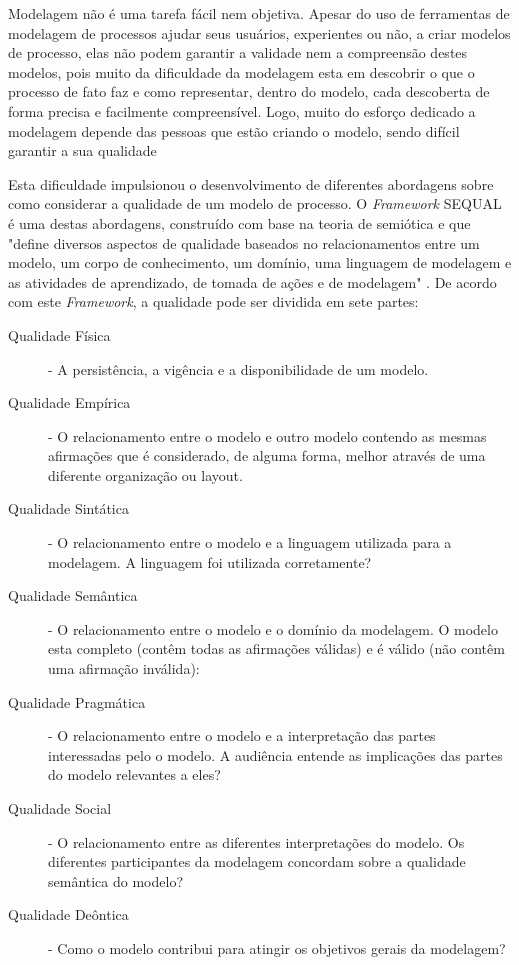 \documentclass[12pt]{article}
\begin{document}
Modelagem não é uma tarefa fácil nem objetiva. Apesar do uso de ferramentas de modelagem de processos ajudar seus usuários, experientes ou não, a criar modelos de processo, elas não podem garantir a validade nem a compreensão destes modelos, pois muito da dificuldade da modelagem esta em descobrir o que o processo de fato faz e como representar, dentro do modelo, cada descoberta de forma precisa e facilmente compreensível. Logo, muito do esforço dedicado a modelagem depende das pessoas que estão criando o modelo, sendo difícil garantir a sua qualidade \cite{Mendling2008}

Esta dificuldade impulsionou o desenvolvimento de diferentes abordagens sobre como considerar a qualidade de um modelo de processo. O \textit{Framework} SEQUAL \cite{Krogstie2006,Lindland1994} é uma destas abordagens, construído com base na teoria de semiótica e que "define diversos aspectos de qualidade baseados no relacionamentos entre um modelo, um corpo de conhecimento, um domínio, uma linguagem de modelagem e as atividades de aprendizado, de tomada de ações e de modelagem" \cite{Mendling2007}. De acordo com este \textit{Framework}, a qualidade pode ser dividida em sete partes:

\begin{description}
	\item [Qualidade Física] - A persistência, a vigência e a disponibilidade de um modelo.
	\item [Qualidade Empírica] - O relacionamento entre o modelo e outro modelo contendo as mesmas afirmações que é considerado, de alguma forma, melhor através de uma diferente organização ou layout.
	\item [Qualidade Sintática] - O relacionamento entre o modelo e a linguagem utilizada para a modelagem. A linguagem foi utilizada corretamente?
	\item [Qualidade Semântica] - O relacionamento entre o modelo e o domínio da modelagem. O modelo esta completo (contêm todas as afirmações válidas) e é válido (não contêm uma afirmação inválida):
	\item [Qualidade Pragmática] - O relacionamento entre o modelo e a interpretação das partes interessadas pelo o modelo. A audiência entende as implicações das partes do modelo relevantes a eles?
	\item [Qualidade Social] - O relacionamento entre as diferentes interpretações do modelo. Os diferentes participantes da modelagem concordam sobre a qualidade semântica do modelo?
	\item [Qualidade Deôntica] - Como o modelo contribui para atingir os objetivos gerais da modelagem?
\end{description}
\end{document}
